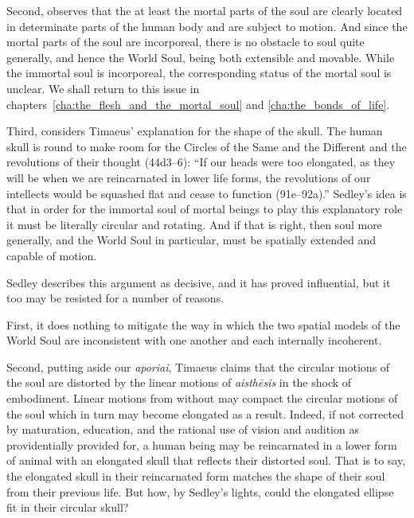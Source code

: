 Second, \citet[330]{Sedley:1997kr} observes that the at least the mortal parts of the soul are clearly located in determinate parts of the human body and are subject to motion. And since the mortal parts of the soul are incorporeal, there is no obstacle to soul quite generally, and hence the World Soul, being both extensible and movable. While the immortal soul is incorporeal, the corresponding status of the mortal soul is unclear. We shall return to this issue in chapters~\ref{cha:the_flesh_and_the_mortal_soul} and \ref{cha:the_bonds_of_life}. 

Third, \citet[330]{Sedley:1997kr} considers Timaeus' explanation for the shape of the skull. The human skull is round to make room for the Circles of the Same and the Different and the revolutions of their thought (44d3--6): ``If our heads were too elongated, as they will be when we are reincarnated in lower life forms, the revolutions of our intellects would be squashed flat and cease to function (91e--92a).'' Sedley's idea is that in order for the immortal soul of mortal beings to play this explanatory role it must be literally circular and rotating. And if that is right, then soul more generally, and the World Soul in particular, must be spatially extended and capable of motion. 

Sedley describes this argument as decisive, and it has proved influential, but it too may be resisted for a number of reasons. 

First, it does nothing to mitigate the way in which the two spatial models of the World Soul are inconsistent with one another and each internally incoherent. 

Second, putting aside our \emph{aporiai}, Timaeus claims that the circular motions of the soul are distorted by the linear motions of \emph{aisthēsis} in the shock of embodiment. Linear motions from without may compact the circular motions of the soul which in turn may become elongated as a result. Indeed, if not corrected by maturation, education, and the rational use of vision and audition as providentially provided for, a human being may be reincarnated in a lower form of animal with an elongated skull that reflects their distorted soul. That is to say, the elongated skull in their reincarnated form matches the shape of their soul from their previous life. But how, by Sedley's lights, could the elongated ellipse fit in their circular skull? 

